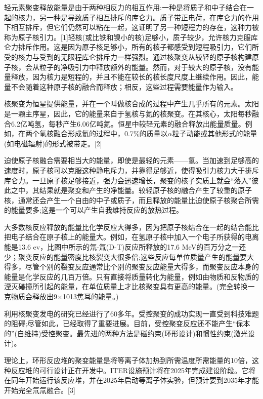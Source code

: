 轻元素聚变释放能量是由于两种相反力的相互作用:一种是将质子和中子结合在一起的核力，另一种是导致质子相互排斥的库仑力。质子带正电荷，在库仑力的作用下相互排斥，但它们仍然可以粘在一起，这证明了另一种短程力的存在，这种力被称为原子核引力。[1]轻核(或比铁和镍小的核)足够小，质子较少，允许核力克服库仑力排斥作用。这是因为原子核足够小，所有的核子都感受到短程吸引力，它们所受的核力与受到的无限程库仑排斥力一样强烈。通过核聚变从较轻的原子核构建原子核，会从粒子的净吸引力中释放额外的能量。然而，对于较大的原子核，没有能量释放，因为核力是短程的，并且不能在较长的核长度尺度上继续作用。因此，能量不会随着这种原子核的融合而释放；相反，这些过程需要能量作为输入。

核聚变为恒星提供能量，并在一个叫做核合成的过程中产生几乎所有的元素。太阳是一颗主序星，因此，它的能量来自于氢核与氦的核聚变。在其核心，太阳每秒融合6.2亿吨氢，每秒产生6.06亿吨氦。恒星中较轻元素的融合释放出能量质量。例如，在两个氢核融合形成氦的过程中，0.7\%的质量以$\alpha$粒子动能或其他形式的能量(如电磁辐射)的形式被带走。[2]

迫使原子核融合需要相当大的能量，即使是最轻的元素——氢。当加速到足够高的速度时，原子核可以克服这种静电斥力，并靠得足够近，使得吸引力核力大于排斥库仑力。一旦原子核足够接近，强力会迅速增长，聚变的核子实质上就会“落入”彼此之中，其结果就是聚变和产生的净能量。较轻原子核的融合产生了较重的原子核，通常还会产生一个自由的中子或质子，而且释放的能量比迫使原子核聚合所需的能量要多;这是一个可以产生自我维持反应的放热过程。

大多数核反应释放的能量比化学反应大得多，因为把原子核结合在一起的结合能比把电子结合在原子核上的能量大。例如，在氢原子核中加入一个电子所获得的电离能是13.6 ev，比图中所示的氘-氚(D-T)反应所释放的17.6 MeV的百万分之一还少；聚变反应的能量密度比核裂变大很多倍;这些反应每单位质量产生的能量要大得多，尽管个别的裂变反应通常比个别的聚变反应能量大得多，而聚变反应本身的能量是化学反应的几百万倍。只有直接将质量转化为能量，例如由物质和反物质的湮灭碰撞所引起的能量，在单位质量上才比核聚变具有更高的能量。(完全转换一克物质会释放出9×1013焦耳的能量。)

利用核聚变发电的研究已经进行了60多年。受控聚变的成功实现一直受到科技难题的阻碍;尽管如此，已经取得了重要进展。目前，受控聚变反应还不能产生“保本的”(自维持)受控聚变。最先进的两种方法是磁约束(环形设计)和惯性约束(激光设计)。

理论上，环形反应堆的聚变能量是将等离子体加热到所需温度所需能量的10倍，这种反应堆的可行设计正在开发中。ITER设施预计将在2025年完成建设阶段。它将在同年开始运行该反应堆，并在2025年启动等离子体实验，但预计要到2035年才能开始完全氘氚融合。[3]


